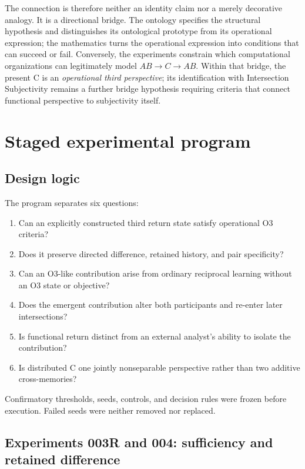 \documentclass[11pt,a4paper]{article}
\begin{document}
The connection is therefore neither an identity claim nor a merely decorative analogy. It is a directional bridge. The ontology specifies the structural hypothesis and distinguishes its ontological prototype from its operational expression; the mathematics turns the operational expression into conditions that can succeed or fail. Conversely, the experiments constrain which computational organizations can legitimately model $AB\rightarrow C\rightarrow AB$. Within that bridge, the present C is an \emph{operational third perspective}; its identification with Intersection Subjectivity remains a further bridge hypothesis requiring criteria that connect functional perspective to subjectivity itself.

\section{Staged experimental program}

\subsection{Design logic}

The program separates six questions:
\begin{enumerate}
  \item Can an explicitly constructed third return state satisfy operational O3 criteria?
  \item Does it preserve directed difference, retained history, and pair specificity?
  \item Can an O3-like contribution arise from ordinary reciprocal learning without an O3 state or objective?
  \item Does the emergent contribution alter both participants and re-enter later intersections?
  \item Is functional return distinct from an external analyst's ability to isolate the contribution?
  \item Is distributed C one jointly nonseparable perspective rather than two additive cross-memories?
\end{enumerate}
Confirmatory thresholds, seeds, controls, and decision rules were frozen before execution. Failed seeds were neither removed nor replaced.

\subsection{Experiments 003R and 004: sufficiency and retained difference}
\end{document}
